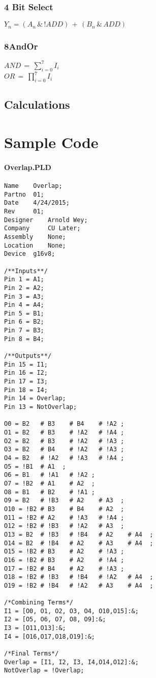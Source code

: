 \documentclass[letterpaper,titlepage,oneside]{article}
\begin{document}
\subsubsection{4 Bit Select}
\begin{normalsize}
$Y_{n} = (A_{n} \,\&\, !ADD) \,+\, (B_{n} \,\&\, ADD)$
\end{normalsize}
\subsubsection{8AndOr}
\begin{normalsize}
$AND \,=\, \sum_{i=0}^{7} I_{i} $
\\[5pt]
$OR \, = \, \prod_{i=0}^{7} I_{i}$
\end{normalsize}

\subsection{Calculations}

\clearpage
\section{Sample Code}

\paragraph*{Overlap.PLD\\}
\label{code:Overlap}
\begin{lstlisting}
Name 	Overlap;
Partno 	01;
Date 	4/24/2015;
Rev 	01;
Designer 	Arnold Wey;
Company 	CU Later;
Assembly 	None;
Location 	None;
Device 	g16v8;

/**Inputs**/
Pin 1 = A1;
Pin 2 = A2;
Pin 3 = A3;
Pin 4 = A4;
Pin 5 = B1;
Pin 6 = B2;
Pin 7 = B3;
Pin 8 = B4;

/**Outputs**/
Pin 15 = I1;
Pin 16 = I2;
Pin 17 = I3;
Pin 18 = I4;
Pin 14 = Overlap;
Pin 13 = NotOverlap;

O0 = B2   # B3    # B4    # !A2 ;
O1 = B2   # B3    # !A2   # !A4 ;
O2 = B2   # B3    # !A2   # !A3 ;
O3 = B2   # B4    # !A2   # !A3 ;
O4 = B2   # !A2   # !A3   # !A4 ;
O5 = !B1  # A1  ;
O6 = B1   # !A1   # !A2 ;
O7 = !B2  # A1    # A2  ;
O8 = B1   # B2    # !A1 ;
O9 = B2   # !B3   # A2    # A3  ;
O10 = !B2 # B3    # B4    # A2  ;
O11 = !B2 # A2    # !A3   # !A4 ;
O12 = !B2 # !B3   # !A2   # A3  ;
O13 = B2  # !B3   # !B4   # A2    # A4  ;
O14 = B2  # !B4   # A2    # A3    # A4  ;
O15 = !B2 # B3    # A2    # !A3 ;
O16 = !B2 # B3    # A2    # !A4 ;
O17 = !B2 # B4    # A2    # !A3 ;
O18 = !B2 # !B3   # !B4   # !A2   # A4  ;
O19 = !B2 # !B4   # !A2   # A3    # A4  ;

/*Combining Terms*/
I1 = [O0, O1, O2, O3, O4, O10,O15]:&;
I2 = [O5, O6, O7, O8, O9]:&;
I3 = [O11,O13]:&;
I4 = [O16,O17,O18,O19]:&;

/*Final Terms*/
Overlap = [I1, I2, I3, I4,O14,O12]:&;
NotOverlap = !Overlap;



\end{lstlisting}
\end{document}
